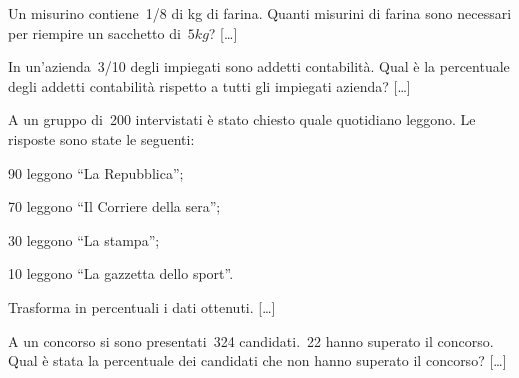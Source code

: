 \begin{multicols}{2}
\begin{esercizio}
\label{ese:3.183}
 Un misurino contiene~1/8 di kg di farina. Quanti misurini di farina
sono necessari per riempire un sacchetto di~\(5\unit{kg}\)? \hfill [\dots]
\end{esercizio}

% 
% 

\begin{esercizio}
\label{ese:3.187}
 In un'azienda~3/10 degli impiegati sono addetti
contabilità. Qual è la percentuale degli addetti contabilità
rispetto a tutti gli impiegati azienda? \hfill [\dots]
\end{esercizio}

\begin{esercizio}
\label{ese:3.188}
 A un gruppo di~200 intervistati è stato chiesto quale quotidiano
leggono. Le risposte sono state le seguenti:
\begin{itemize*}
\item 90 leggono ``La Repubblica'';
\item 70 leggono ``Il Corriere della sera'';
\item 30 leggono ``La stampa'';
\item 10 leggono ``La gazzetta dello sport''.
\end{itemize*}
Trasforma in percentuali i dati ottenuti. \hfill [\dots]
\end{esercizio}

\begin{esercizio}
\label{ese:3.189}
 A un concorso si sono presentati~324 candidati.~22 hanno superato il
concorso. Qual è stata la percentuale dei candidati che non hanno
superato il concorso? \hfill [\dots]
\end{esercizio}


\end{multicols}

